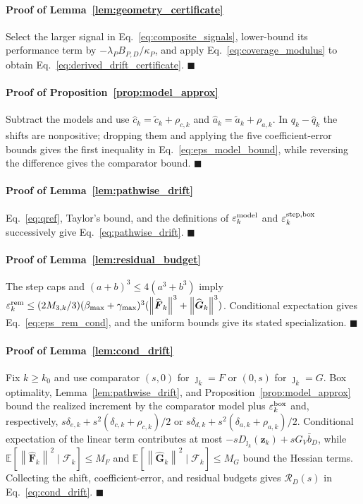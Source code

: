 \documentclass{article}
\theoremstyle{remark}
\newcommand{\E}{\mathbb{E}}
\newcommand{\norm}[1]{\left\lVert #1\right\rVert}
\newcommand{\bz}{\boldsymbol{z}}
\newcommand{\hatF}{\widehat{\boldsymbol{F}}}
\newcommand{\hatG}{\widehat{\boldsymbol{G}}}
\begin{document}
\paragraph{Proof of Lemma~\ref{lem:geometry_certificate}}\label{app:geometry_certificate}
Select the larger signal in Eq.~\eqref{eq:composite_signals}, lower-bound its performance term by $-\lambda_PB_{P,D}/\kappa_P$, and apply Eq.~\eqref{eq:coverage_modulus} to obtain Eq.~\eqref{eq:derived_drift_certificate}.
\hfill$\blacksquare$

\paragraph{Proof of Proposition~\ref{prop:model_approx}}\label{app:model_approx}
Subtract the models and use $\hat c_k=\tilde c_k+\rho_{c,k}$ and $\hat a_k=\tilde a_k+\rho_{a,k}$.
In $q_k-\hat q_k$ the shifts are nonpositive; dropping them and applying the five coefficient-error bounds gives the first inequality in Eq.~\eqref{eq:eps_model_bound}, while reversing the difference gives the comparator bound.
\hfill$\blacksquare$

\paragraph{Proof of Lemma~\ref{lem:pathwise_drift}}\label{app:pathwise_drift}
Eq.~\eqref{eq:qref}, Taylor's bound, and the definitions of $\varepsilon_k^{\rm model}$ and $\varepsilon_k^{\rm step,box}$ successively give Eq.~\eqref{eq:pathwise_drift}.
\hfill$\blacksquare$

\paragraph{Proof of Lemma~\ref{lem:residual_budget}}\label{app:residual_budget}
The step caps and $(a+b)^3\le4(a^3+b^3)$ imply $\varepsilon_k^{\rm rem}\le(2M_{3,k}/3)(\beta_{\max}+\gamma_{\max})^3 (\norm{\hatF_k}^3+\norm{\hatG_k}^3)$.
Conditional expectation gives Eq.~\eqref{eq:eps_rem_cond}, and the uniform bounds give its stated specialization.
\hfill$\blacksquare$

\paragraph{Proof of Lemma~\ref{lem:cond_drift}}\label{app:cond_drift}
Fix $k\ge k_0$ and use comparator $(s,0)$ for $\jmath_k=F$ or $(0,s)$ for $\jmath_k=G$.
Box optimality, Lemma~\ref{lem:pathwise_drift}, and Proposition~\ref{prop:model_approx} bound the realized increment by the comparator model plus $\varepsilon_k^{\rm box}$ and, respectively, $s\delta_{e,k}+s^2(\delta_{c,k}+\rho_{c,k})/2$ or $s\delta_{d,k}+s^2(\delta_{a,k}+\rho_{a,k})/2$.
Conditional expectation of the linear term contributes at most $-sD_{\jmath_k}(\bz_k)+sG_V\bar b_D$, while $\E[\norm{\hatF_k}^2\mid\mathscr F_k]\le M_F$ and $\E[\norm{\hatG_k}^2\mid\mathscr F_k]\le M_G$ bound the Hessian terms.
Collecting the shift, coefficient-error, and residual budgets gives $\mathcal R_D(s)$ in Eq.~\eqref{eq:cond_drift}.
\hfill$\blacksquare$
\end{document}
